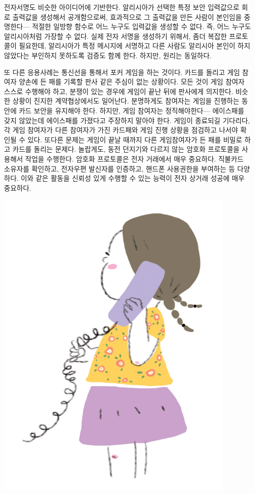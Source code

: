 \documentclass[]{article}
\begin{document}
전자서명도 비슷한 아이디어에 기반한다. 알리시아가 선택한 특정 보안
입력값으로 회로 출력값을 생성해서 공개함으로써, 효과적으로 그 출력값을
만든 사람이 본인임을 중명한다--- 적절한 일방향 함수로 어느 누구도
입력값을 생성할 수 없다. 즉, 어느 누구도 알리시아처럼 가장할 수 없다.
실제 전자 서명을 생성하기 위해서, 좀더 복잡한 프로토콜이 필요한데,
알리시아가 특정 메시지에 서명하고 다른 사람도 알리시아 본인이 하지
않았다는 부인하지 못하도록 검증도 함께 한다. 하지만, 원리는 동일하다.

또 다른 응용사례는 통신선을 통해서 포커 게임을 하는 것이다. 카드를
돌리고 게임 참여자 양손에 든 패를 기록할 판사 같은 주심이 없는 상황이다.
모든 것이 게임 참여자 스스로 수행해야 하고, 분쟁이 있는 경우에 게임이
끝난 뒤에 판사에게 의지한다. 비슷한 상황이 진지한 계약협상에서도
일어난다. 분명하게도 참여자는 게임을 진행하는 동안에 카드 보안을
유지해야 한다. 하지만, 게임 참여자는 정직해야한다--- 에이스패를 갖지
않았는데 에이스패를 가졌다고 주장하지 말아야 한다. 게임이 종료되길
기다리다, 각 게임 참여자가 다른 참여자가 가진 카드패와 게임 진행 상황을
점검하고 나서야 확인될 수 있다. 또다른 문제는 게임이 끝날 때까지 다른
게임참여자가 든 패를 비밀로 하고 카드를 돌리는 문제다. 놀랍게도, 동전
던지기와 다르지 않는 암호화 프로토콜을 사용해서 작업을 수행한다. 암호화
프로토콜은 전자 거래에서 매우 중요하다. 직불카드 소유자를 확인하고,
전자우편 발신자를 인증하고, 핸드폰 사용권한을 부여하는 등 다양하다. 이와
같은 활동을 신뢰성 있게 수행할 수 있는 능력이 전자 상거래 성공에 매우
중요하다.

\includegraphics{csunplugged/05-part/img/ch18-crypto/17-crypto-09-girl-can.png}
\end{document}
